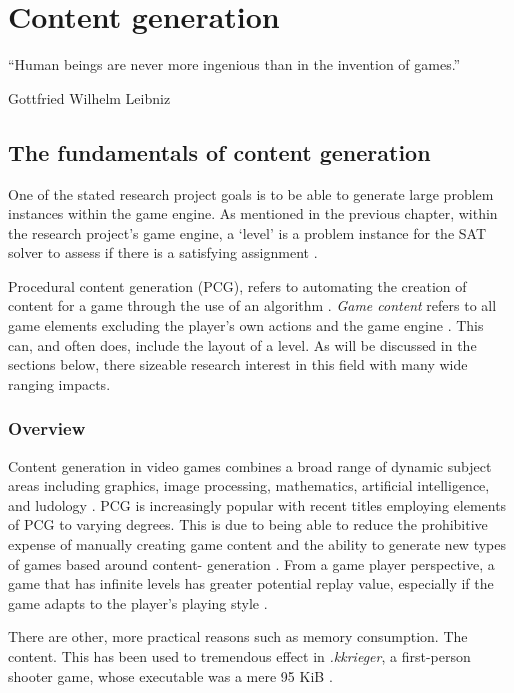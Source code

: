 \documentclass[11pt, a4paper, oneside]{report} %
\begin{document}
\chapter{Content generation}


\epigraph{``Human beings are never more ingenious than in the invention of
games.''}{Gottfried Wilhelm Leibniz}


\section{The fundamentals of content generation}

One of the stated research project goals is to be able to generate large problem
instances within the game engine. As mentioned in the previous chapter, within
the research project's game engine, a `level' is a problem instance for the SAT
solver to assess if there is a satisfying assignment \cite{Aloupis2012} .

Procedural content generation (PCG), refers to automating the creation of
content for a game through the use of an algorithm
\cite{Hendrikx:2013:PCG:2422956.2422957, 5756645}. \textit{Game content} refers
to all game elements excluding the player's own actions and the game engine
\cite{Burgun:2012}. This can, and often does, include the layout of a level. As
will be discussed in the sections below, there sizeable research interest in
this field with many wide ranging impacts.

\subsection{Overview}

Content generation in video games combines a broad range of dynamic subject
areas including graphics, image processing, mathematics, artificial
intelligence, and ludology \cite{Hendrikx:2013:PCG:2422956.2422957}. PCG is
increasingly popular with recent titles employing elements of PCG to varying
degrees. This is due to being able to reduce the prohibitive expense of manually
creating game content \cite{Hendrikx:2013:PCG:2422956.2422957} and the ability
to generate new types of games based around content- generation \cite{5756645}.
From a game player perspective, a game that has infinite levels has greater
potential replay value, especially if the game adapts to the player's playing
style \cite{6424299}.

There are other, more practical reasons such as memory
consumption. The content. This has been used to tremendous effect in \textit{.kkrieger}, a
first-person shooter game, whose executable was a mere 95 KiB
\cite{Hendrikx:2013:PCG:2422956.2422957}.
\end{document}
